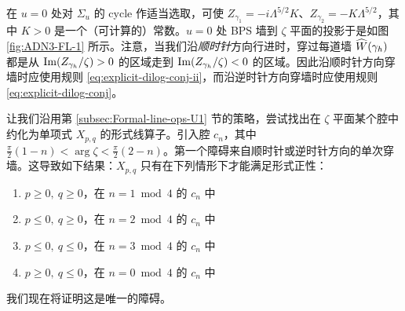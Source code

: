 
在 $u=0$ 处对 $\Sigma_u$ 的 cycle 作适当选取，可使 $Z_{\gamma_1} = -i\Lambda^{5/2}K$、$Z_{\gamma_2} = -K\Lambda^{5/2}$，其中 $K>0$ 是一个（可计算的）常数。$u=0$ 处 BPS 墙到 $\zeta$ 平面的投影于是如图 \ref{fig:ADN3-FL-1} 所示。注意，当我们沿\emph{顺时针}方向行进时，穿过每道墙 $\widehat W(\gamma_h)$ 都是从 ${\rm Im}(Z_{\gamma_h}/\zeta)>0$ 的区域走到 ${\rm Im}(Z_{\gamma_h}/\zeta)<0$ 的区域。因此沿顺时针方向穿墙时应使用规则 \eqref{eq:explicit-dilog-conj-ii}，而沿逆时针方向穿墙时应使用规则 \eqref{eq:explicit-dilog-conj}。

让我们沿用第 \ref{subsec:Formal-line-ops-U1} 节的策略，尝试找出在 $\zeta$ 平面某个腔中约化为单项式 $X_{p,q}$ 的形式线算子。引入腔 $c_n$，其中 $\frac{\pi}{2}(1-n) < \arg\zeta < \frac{\pi}{2}(2-n)$。第一个障碍来自顺时针或逆时针方向的单次穿墙。这导致如下结果：$X_{p,q}$ 只有在下列情形下才能满足形式正性：

\begin{enumerate}

\item $p\geq 0,\ q\geq 0$，在 $n=1\bmod 4$ 的 $c_n$ 中

\item $p\leq 0,\ q\geq 0$，在 $n=2\bmod 4$ 的 $c_n$ 中

\item $p\leq 0,\ q\leq 0$，在 $n=3\bmod 4$ 的 $c_n$ 中

\item $p\geq 0,\ q\leq 0$，在 $n=0\bmod 4$ 的 $c_n$ 中

\end{enumerate}

我们现在将证明这是唯一的障碍。






